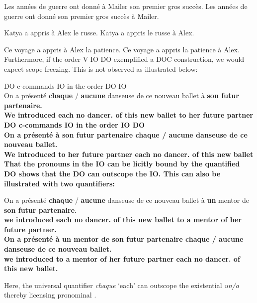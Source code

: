 \documentclass[output=paper]{langsci/langscibook}
\begin{document}
\ea \ea Les ann\'ees de guerre ont donn\'e \`a Mailer son premier gros
succ\`es.
\ex Les ann\'ees de guerre ont donn\'e son premier gros succ\`es \`a Mailer.
\z
\z

\ea \ea Katya a appris \`a Alex le russe.
\ex Katya a appris le russe  \`a Alex.
\z
\z

\ea \ea Ce voyage a appris \`a Alex la patience.
\ex Ce voyage a appris la patience  \`a Alex.
\z
\z
%
Furthermore, if the order V IO DO exemplified a \gls{DOC} construction, we
would expect scope freezing. This is not observed as illustrated below:

\ea \label{doio4}
\ea  DO c-commands IO in the order DO IO\\
\gll On {a pr\'{e}sent\'{e}} {\bf chaque} / {\bf aucune} danseuse de ce nouveau ballet \`{a} \bf{son} futur partenaire.\\
We introduced each {} no dancer.\glossF{} of this new ballet to her future partner\\
\ex  DO c-commands IO in the order IO DO\\
\gll On {a pr\'{e}sent\'{e}} \`{a} {\bf son} futur partenaire {\bf chaque} / {\bf aucune} danseuse de ce nouveau ballet.\\
We introduced to her future partner each {} no dancer.\glossF{} of this new ballet\\
\z
\z
%
That the pronouns in the IO can be licitly bound by the quantified DO shows
that the DO can outscope the IO. This can also be illustrated with two
    quantifiers:

\begin{exe}
    \ex\label{ex:key:20.28}%
    \begin{xlist}
    \ex
        \gll On {a  pr\'{e}sent\'{e}} {\bf chaque} / {\bf aucune} danseuse de ce nouveau ballet \`{a} {\bf un} mentor de \bf{son} futur partenaire.\\
        we introduced each {} no dancer.\glossF{} of this new ballet to a mentor of her future partner.\\
        \ex  \gll On {a  pr\'{e}sent\'{e}}  \`{a} {\bf un} mentor de {\bf son} futur partenaire {\bf chaque} / {\bf aucune} danseuse de ce nouveau ballet.\\
        we introduced to a mentor of her future partner each {} no dancer.\glossF{} of this new ballet.\\
    \end{xlist}
\end{exe}
%
Here, the universal quantifier {\it chaque} \enquote*{each} can outscope the
existential {\it un/a} thereby licensing pronominal .
\end{document}
